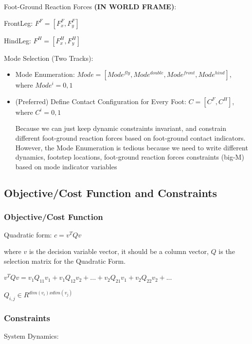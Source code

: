 \documentclass[a4paper,10pt]{article}
\begin{document}
\vspace{3mm}

Foot-Ground Reaction Forces \textbf{(IN WORLD FRAME)}:

FrontLeg: $F^F=[F^F_x,F^F_y]$

HindLeg: $F^H=[F^H_x,F^H_y]$
\vspace{2mm}

Mode Selection (Two Tracks):

\begin{itemize}
	\item Mode Enumeration: $Mode = [Mode^{fly},Mode^{double},Mode^{front},Mode^{hind}]$, where $Mode^i = 0,1$
	
	\item (Preferred) Define Contact Configuration for Every Foot: $C = [C^F, C^H]$, where $C^i = 0,1$
	
	Because we can just keep dynamic constraints invariant, and constrain different foot-ground reaction forces based on foot-ground contact indicators. However, the Mode Enumeration is tedious because we need to write different dynamics, footstep locations, foot-ground reaction forces constraints (big-M) based on mode indicator variables
	
\end{itemize}

\subsection{Objective/Cost Function and Constraints}

\subsubsection{Objective/Cost Function}

Quadratic form: $c = v^TQv$

where $v$ is the decision variable vector, it should be a column vector, $Q$ is the selection matrix for the Quadratic Form.

\vspace{2mm}
$v^TQv = v_1Q_{11}v_1 + v_1Q_{12}v_2 + ... + v_2Q_{21}v_1 + v_2Q_{22}v_2 + ...$

$Q_{i,j} \in R^{dim(v_i) x dim(v_j)}$ %

\subsubsection{Constraints}

System Dynamics:
\end{document}
